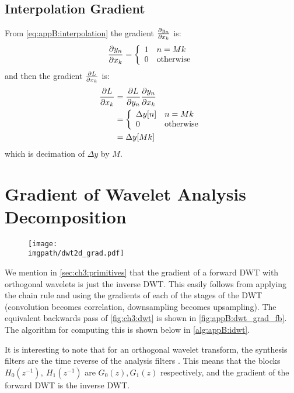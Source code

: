 \subsection{Interpolation Gradient}
From \eqref{eq:appB:interpolation} the gradient $\frac{\partial y_n}{\partial x_k}$ is:
\begin{equation}
  \frac{\partial y_n}{\partial x_k} = \left\{ \begin{array}{ll}
    1 & n = Mk \\
    0 & \text{otherwise}
  \end{array} \right.
\end{equation}
and then the gradient $\frac{\partial L}{\partial x_k}$ is:
\begin{align}
  \frac{\partial L}{\partial x_k} &= \frac{\partial L}{\partial y_n}\frac{\partial y_n}{\partial x_k} \\
                &= \left\{ \begin{array}{ll} 
                \Delta y[n] & n = Mk\\
                  0 & \text{otherwise} 
                \end{array}\right. \\
                &= \Delta y[Mk]
\end{align}
which is decimation of $\Delta y$ by $M$.
 
\section{Gradient of Wavelet Analysis Decomposition}\label{sec:appB:analysis_gradient}
\begin{figure}
  \centering
  \texttt{[image: \\imgpath/dwt2d\_grad.pdf]}
  \label{fig:appB:dwt_grad_fb}
\end{figure}
We mention in \autoref{sec:ch3:primitives} that the gradient of a forward DWT with
orthogonal wavelets is just the inverse DWT. 
This easily follows from applying the chain rule and using the gradients of each of the
stages of the DWT (convolution becomes correlation, downsampling becomes
upsampling). The equivalent backwards pass of \autoref{fig:ch3:dwt} is
shown in \autoref{fig:appB:dwt_grad_fb}. The algorithm for computing this is
shown below in \autoref{alg:appB:idwt}.

It is interesting to note that for an orthogonal wavelet transform, the
synthesis filters are the time reverse of the analysis filters \cite[Chapter
3]{vetterli_wavelets_2007}. This means that the blocks $H_0(z^{-1}),\ H_1(z^{-1})$ 
are $G_0(z), G_1(z)$ respectively, and the gradient of the forward DWT is the 
inverse DWT.

